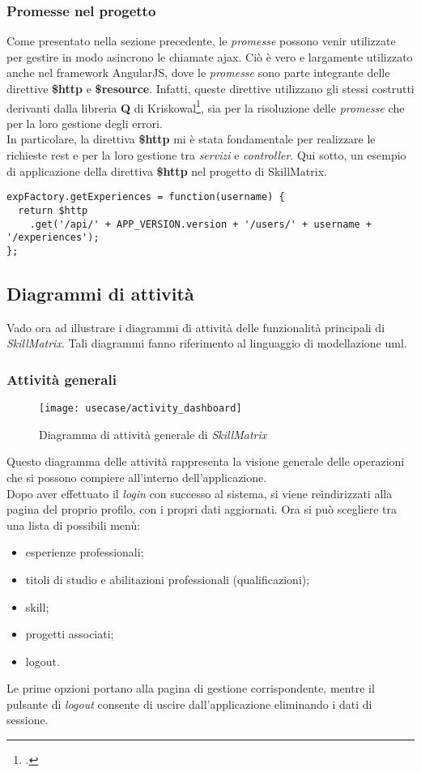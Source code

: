 \subsubsection{Promesse nel progetto}
Come presentato nella sezione precedente, le \emph{promesse} possono venir utilizzate per gestire in modo asincrono le chiamate \gls{ajax}. Ciò è vero e largamente utilizzato anche nel framework AngularJS, dove le \emph{promesse} sono parte integrante delle direttive \textbf{\$http} e \textbf{\$resource}. Infatti, queste direttive utilizzano gli stessi costrutti derivanti dalla libreria \textbf{Q} di Kriskowal\footcite{site:q}, sia per la risoluzione delle \emph{promesse} che per la loro gestione degli errori.\\
In particolare, la direttiva \textbf{\$http} mi è stata fondamentale per realizzare le richieste \gls{rest} e per la loro gestione tra \emph{servizi} e \emph{controller}. Qui sotto, un esempio di applicazione della direttiva \textbf{\$http} nel progetto di SkillMatrix.
\begin{verbatim}
expFactory.getExperiences = function(username) {
  return $http
    .get('/api/' + APP_VERSION.version + '/users/' + username + '/experiences');
};
\end{verbatim}

\subsection{Diagrammi di attività}
Vado ora ad illustrare i diagrammi di attività delle funzionalità principali di \emph{SkillMatrix}. Tali diagrammi fanno riferimento al linguaggio di modellazione \gls{uml}.

\subsubsection{Attività generali}
\begin{figure}[!h] 
    \centering 
    \texttt{[image: usecase/activity\_dashboard]} 
    \caption{Diagramma di attività generale di \emph{SkillMatrix}}
\end{figure}
Questo diagramma delle attività rappresenta la visione generale delle operazioni che si possono compiere all'interno dell'applicazione.\\
Dopo aver effettuato il \emph{login} con successo al sistema, si viene reindirizzati alla pagina del proprio profilo, con i propri dati aggiornati. Ora si può scegliere tra una lista di possibili menù:
\begin{itemize}
	\item esperienze professionali;
	\item titoli di studio e abilitazioni professionali (qualificazioni);
	\item skill;
	\item progetti associati;
	\item logout.
\end{itemize}
Le prime opzioni portano alla pagina di gestione corrispondente, mentre il pulsante di \emph{logout} consente di uscire dall'applicazione eliminando i dati di sessione.


